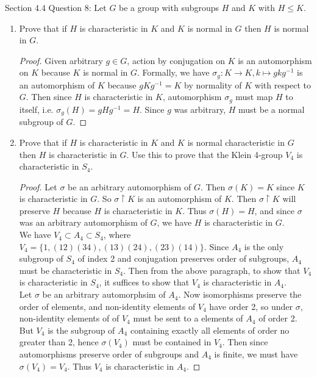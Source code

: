 Section 4.4 Question 8: Let $G$ be a group with subgroups $H$ and $K$ with
$H\leq K$.

\begin{enumerate}
  \item Prove that if $H$ is characteristic in $K$ and $K$ is normal in $G$
    then $H$ is normal in $G$.
    \begin{proof}
      Given arbitrary $g\in G$, action by conjugation on $K$ is an
      automorphism on $K$ because $K$ is normal in $G$. Formally, we have
      $\sigma_g:K\rightarrow K, k\mapsto gkg^{-1}$ is an automorphism of
      $K$ because $gKg^{-1}=K$ by normality of $K$ with respect to $G$.
      Then since $H$ is characteristic in $K$, automorphism $\sigma_g$
      must map $H$ to itself, i.e. $\sigma_g(H)=gHg^{-1}=H$. Since $g$ was
      arbitrary, $H$ must be a normal subgroup of $G$.
    \end{proof}

  \item Prove that if $H$ is characteristic in $K$ and $K$ is normal
    characteristic in $G$ then $H$ is characteristic in $G$. Use this to
    prove that the Klein 4-group $V_4$ is characteristic in $S_4$.

    \begin{proof}
      Let $\sigma$ be an arbitrary automorphism of $G$. Then $\sigma(K)=K$
      since $K$ is characteristic in $G$. So $\sigma\restriction K$ is an
      automorphism of $K$. Then $\sigma\restriction K$ will preserve $H$
      because $H$ is characteristic in $K$. Thus $\sigma(H)=H$, and since
      $\sigma$ was an arbitrary automorphism of $G$, we have $H$ is
      characteristic in $G$. \\

      We have $V_4\subset A_4\subset S_4$, where
      $V_4=\{1,(12)(34),(13)(24),(23)(14)\}$. Since $A_4$ is the only
      subgroup of $S_4$ of index 2 and conjugation preserves order of
      subgroups, $A_4$ must be characteristic in $S_4$. Then from the above
      paragraph, to show that $V_4$ is characteristic in $S_4$, it suffices
      to show that $V_4$ is characteristic in $A_4$. \\

      Let $\sigma$ be an arbitrary automorphsim of $A_4$. Now isomorphisms
      preserve the order of elements, and non-identity elements of $V_4$
      have order 2, so under $\sigma$, non-identity elements of of $V_4$
      must be sent to a elements of $A_4$ of order 2. But $V_4$ is the
      subgroup of $A_4$ containing exactly all elements of order no greater
      than 2, hence $\sigma(V_4)$ must be contained in $V_4$. Then since
      automorphisms preserve order of subgroups and $A_4$ is finite, we
      must have $\sigma(V_4)=V_4$. Thus $V_4$ is characteristic in $A_4$.
    \end{proof}


\end{enumerate}
